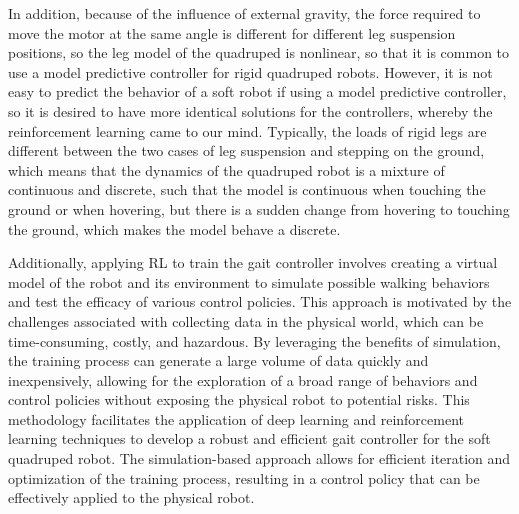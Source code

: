 In addition, because of the influence of external gravity, the force required to move the motor at the same angle is different for different leg suspension positions, so the leg model of the quadruped is nonlinear, so that it is common to use a model predictive controller for rigid quadruped robots. However, it is not easy to predict the behavior of a soft robot if using a model predictive controller\cite{BemporadLinearTimevaryingNonlinearMPC}, so it is desired to have more identical solutions for the controllers, whereby the  reinforcement learning came to our mind\cite{hewingLearningbasedModelPredictive2020}. Typically, the loads of rigid legs are different between the two cases of leg suspension and stepping on the ground\cite{biswalDevelopmentQuadrupedWalking2021}, which means that the dynamics of the quadruped robot is a mixture of continuous and discrete, such that the model is continuous when touching the ground or when hovering, but there is a sudden change from hovering to touching the ground, which makes the model behave a discrete. 

Additionally, applying \ac{RL} to train the gait controller involves creating a virtual model of the robot and its environment to simulate possible walking behaviors and test the efficacy of various control policies. This approach is motivated by the challenges associated with collecting data in the physical world, which can be time-consuming, costly, and hazardous. By leveraging the benefits of simulation, the training process can generate a large volume of data quickly and inexpensively, allowing for the exploration of a broad range of behaviors and control policies without exposing the physical robot to potential risks. This methodology facilitates the application of deep learning and reinforcement learning techniques to develop a robust and efficient gait controller for the soft quadruped robot. The simulation-based approach allows for efficient iteration and optimization of the training process, resulting in a control policy that can be effectively applied to the physical robot.
